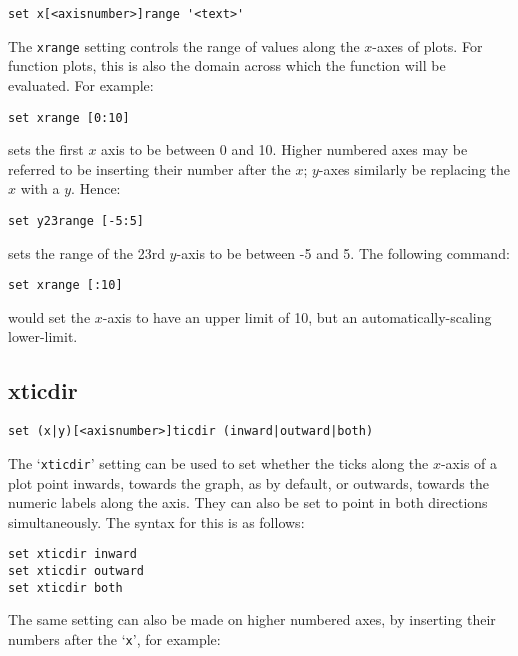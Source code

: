 \documentclass[a4paper,onecolumn,11pt]{book}
\begin{document}
\begin{verbatim}
set x[<axisnumber>]range '<text>'
\end{verbatim}

The {\tt xrange} setting controls the range of values along the $x$-axes of
plots.  For function plots, this is also the domain across which the function
will be evaluated.  For example:

\begin{verbatim}
set xrange [0:10]
\end{verbatim}

\noindent sets the first $x$ axis to be between 0 and 10.  Higher numbered axes may be
referred to be inserting their number after the $x$; $y$-axes similarly be
replacing the $x$ with a $y$.  Hence:

\begin{verbatim}
set y23range [-5:5]
\end{verbatim}

\noindent sets the range of the 23rd $y$-axis to be between -5 and 5.  The
following command:

\begin{verbatim}
set xrange [:10]
\end{verbatim}

\noindent would set the $x$-axis to have an upper limit of 10, but an
automatically-scaling lower-limit.

\subsection{xticdir}

\begin{verbatim}
set (x|y)[<axisnumber>]ticdir (inward|outward|both)
\end{verbatim}

The `{\tt xticdir}' setting can be used to set whether the ticks along the
$x$-axis of a plot point inwards, towards the graph, as by default, or outwards,
towards the numeric labels along the axis. They can also be set to point in both
directions simultaneously. The syntax for this is as follows:

\begin{verbatim}
set xticdir inward 
set xticdir outward 
set xticdir both
\end{verbatim}

The same setting can also be made on higher numbered axes, by inserting their
numbers after the `{\tt x}', for example:
\end{document}
